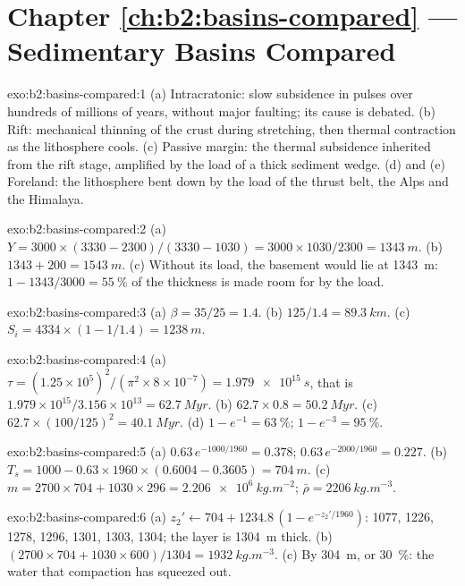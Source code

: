 \section*{Chapter \ref{ch:b2:basins-compared} --- Sedimentary Basins Compared}

\begin{solution}{exo:b2:basins-compared:1}
(a) Intracratonic: slow subsidence in pulses over hundreds of millions of years, without major
faulting; its cause is debated. (b) Rift: mechanical thinning of the crust during stretching,
then thermal contraction as the lithosphere cools. (c) Passive margin: the thermal subsidence
inherited from the rift stage, amplified by the load of a thick sediment wedge. (d) and (e)
Foreland: the lithosphere bent down by the load of the thrust belt, the Alps and the Himalaya.
\end{solution}

\begin{solution}{exo:b2:basins-compared:2}
(a) $Y = 3000\times(3330 - 2300)/(3330 - 1030) = 3000\times1030/2300 = \qty{1343}{m}$.
(b) $1343 + 200 = \qty{1543}{m}$. (c) Without its load, the basement would lie at \qty{1343}{m}:
$1 - 1343/3000 = \qty{55}{\percent}$ of the thickness is made room for by the load.
\end{solution}

\begin{solution}{exo:b2:basins-compared:3}
(a) $\beta = 35/25 = 1.4$. (b) $125/1.4 = \qty{89.3}{km}$. (c) $S_i = 4334\times(1 - 1/1.4) =
\qty{1238}{m}$.
\end{solution}

\begin{solution}{exo:b2:basins-compared:4}
(a) $\tau = (1.25\times10^{5})^2/(\pi^2\times8\times10^{-7}) = \qty{1.979e15}{s}$, that is
$1.979\times10^{15}/3.156\times10^{13} = \qty{62.7}{Myr}$. (b) $62.7\times0.8 = \qty{50.2}{Myr}$.
(c) $62.7\times(100/125)^2 = \qty{40.1}{Myr}$. (d) $1 - e^{-1} = \qty{63}{\percent}$; $1 -
e^{-3} = \qty{95}{\percent}$.
\end{solution}

\begin{solution}{exo:b2:basins-compared:5}
(a) $0.63\,e^{-1000/1960} = 0.378$; $0.63\,e^{-2000/1960} = 0.227$. (b) $T_s = 1000 -
0.63\times1960\times(0.6004 - 0.3605) = \qty{704}{m}$. (c) $m = 2700\times704 + 1030\times296 =
\qty{2.206e6}{kg.m^{-2}}$; $\bar\rho = \qty{2206}{kg.m^{-3}}$.
\end{solution}

\begin{solution}{exo:b2:basins-compared:6}
(a) $z_2' \leftarrow 704 + 1234.8\,(1 - e^{-z_2'/1960})$: 1077, 1226, 1278, 1296, 1301, 1303,
1304; the layer is \qty{1304}{m} thick. (b) $(2700\times704 + 1030\times600)/1304 =
\qty{1932}{kg.m^{-3}}$. (c) By \qty{304}{m}, or \qty{30}{\percent}: the water that compaction
has squeezed out.
\end{solution}

